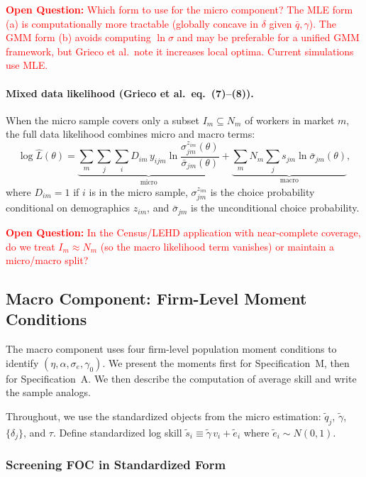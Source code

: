 \documentclass[11pt]{article}
\newcommand{\openq}[1]{\medskip\noindent\textcolor{red}{\textbf{Open Question:} #1}\medskip}
\begin{document}
\openq{Which form to use for the micro component? The MLE form (a) is computationally more tractable (globally concave in $\delta$ given $\bar q,\gamma$). The GMM form (b) avoids computing $\ln\sigma$ and may be preferable for a unified GMM framework, but Grieco et al.\ note it increases local optima. Current simulations use MLE.}

\paragraph{Mixed data likelihood (Grieco et al.\ eq.\ (7)--(8)).} When the micro sample covers only a subset $I_m\subseteq N_m$ of workers in market $m$, the full data likelihood combines micro and macro terms:
\[
\log\hat L(\theta) = \underbrace{\sum_{m}\sum_{j}\sum_{i} D_{im}\,y_{ijm}\ln\frac{\sigma_{jm}^{z_{im}}(\theta)}{\bar\sigma_{jm}(\theta)}}_{\text{micro}} + \underbrace{\sum_m N_m\sum_j s_{jm}\ln\bar\sigma_{jm}(\theta)}_{\text{macro}},
\]
where $D_{im}=1$ if $i$ is in the micro sample, $\sigma_{jm}^{z_{im}}$ is the choice probability conditional on demographics $z_{im}$, and $\bar\sigma_{jm}$ is the unconditional choice probability.

\openq{In the Census/LEHD application with near-complete coverage, do we treat $I_m\approx N_m$ (so the macro likelihood term vanishes) or maintain a micro/macro split?}

\subsection{Macro Component: Firm-Level Moment Conditions}\label{sec:macro}

The macro component uses four firm-level population moment conditions to identify $(\eta, \alpha, \sigma_e, \gamma_0)$. We present the moments first for Specification~M, then for Specification~A. We then describe the computation of average skill and write the sample analogs.

Throughout, we use the standardized objects from the micro estimation: $\tilde q_j$, $\tilde\gamma$, $\{\delta_j\}$, and $\tau$. Define standardized log skill $\tilde s_i \equiv \tilde\gamma\, v_i + \tilde e_i$ where $\tilde e_i \sim N(0,1)$.

\subsubsection{Screening FOC in Standardized Form}
\end{document}
